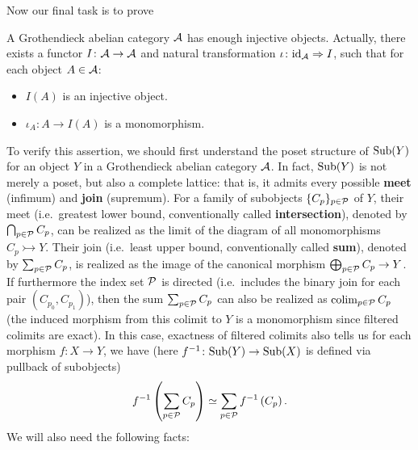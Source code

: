 \documentclass[twoside]{article}
\begin{document}
Now our final task is to prove
\begin{thm}\label{eninj}
A Grothendieck abelian category ${\mathcal{A}}$ has enough injective objects. Actually, there exists a functor $I\colon {\mathcal{A}} \rightarrow {\mathcal{A}}$ and natural transformation $\iota\colon \mathrm{id}_{\mathcal{A}} \Rightarrow I$, such that for each object $A \in {\mathcal{A}}$:
\begin{itemize}
\item $I(A)$ is an injective object.
\item $\iota_A\colon A \rightarrow I(A)$ is a monomorphism.
\end{itemize}
 \end{thm}
To verify this assertion, we should first understand the poset structure of $\mathrm{Sub}(Y)$ for an object $Y$ in a Grothendieck abelian category ${\mathcal{A}}$. In fact, $\mathrm{Sub}(Y)$ is not merely a poset, but also a complete lattice: that is, it admits every possible \textbf{meet} (infimum) and \textbf{join} (supremum).  For a family of subobjects $\{C_p\}_{p \in {\mathcal{P}}}$ of $Y$, their meet (i.e.\ greatest lower bound, conventionally called \textbf{intersection}), denoted by $\bigcap_{p \in {\mathcal{P}}} C_p$,  can be realized as the limit of the diagram of all monomorphisms $C_p \rightarrowtail Y$. Their join (i.e.\ least upper bound, conventionally called \textbf{sum}), denoted by $\sum_{p \in {\mathcal{P}}} C_p$, is realized as the image of the canonical morphism $\bigoplus_{p \in {\mathcal{P}}} C_p \rightarrow Y$. If furthermore the index set ${\mathcal{P}}$ is directed (i.e.\ includes the binary join for each pair $(C_{p_0}, C_{p_1})$), then the sum $\sum_{p \in {\mathcal{P}}} C_p$ can also be realized as $\operatorname*{\mathrm{colim}}_{p \in {\mathcal{P}}} C_p$ (the induced morphism from this colimit to $Y$ is a monomorphism since filtered colimits are exact). In this case, exactness of filtered colimits also tells us for each morphism $f\colon X \rightarrow Y$, we have (here $f^{-1}\colon \mathrm{Sub}(Y) \rightarrow \mathrm{Sub}(X)$ is defined via pullback of  subobjects)
$$f^{-1} \left( \sum_{p \in {\mathcal{P}}} C_p \right) \simeq \sum_{p \in {\mathcal{P}}} f^{-1} \left( C_p\right).$$
We will also need the following facts:
\end{document}
